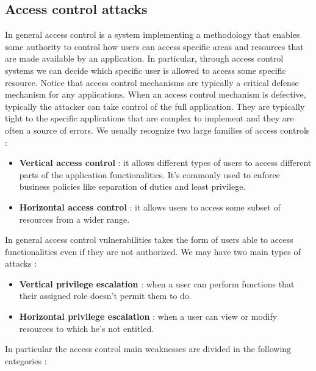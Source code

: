 \subsection{Access control attacks}
In general access control is a system implementing a methodology that enables some authority to control how users can access specific areas and resources that are made available by an application. In particular, through access control systems we can decide which specific user is allowed to access some specific resource. Notice that access control mechanisms are typically a critical defense mechanism for any applications. When an access control mechanism is defective, typically the attacker can take control of the full application. They are typically tight to the specific applications that are complex to implement and they are often a source of errors. We usually recognize two large families of access controls :
\begin{itemize}
\item \textbf{Vertical access control} : it allows different types of users to access different parts of the application functionalities. It's commonly used to enforce business policies like separation of duties and least privilege.
\item \textbf{Horizontal access control} : it allows users to access some subset of resources from a wider range.
\end{itemize}
In general access control vulnerabilities takes the form of users able to access functionalities even if they are not authorized. We may have two main types of attacks :
\begin{itemize}
\item \textbf{Vertical privilege escalation} : when a user can perform functions that their assigned role doesn't permit them to do.
\item \textbf{Horizontal privilege escalation} : when a user can view or modify resources to which he's not entitled.
\end{itemize}
In particular the access control main weaknesses are divided in the following categories :
